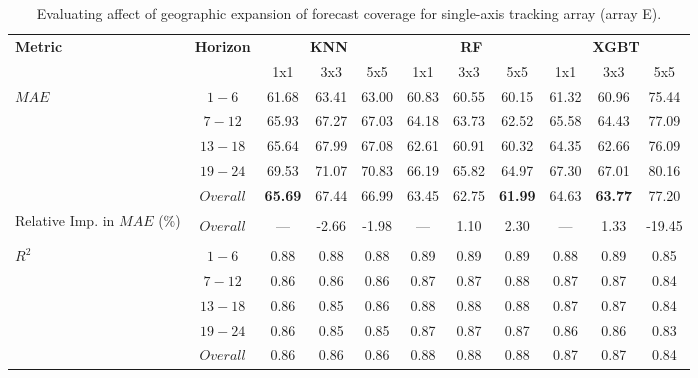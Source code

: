 \begin{table}[h]
\begin{center}
    \caption{Evaluating affect of geographic expansion of forecast coverage for single-axis tracking array (array E).}
    \begin{tabular}{l c c c c c c c c c c}
        \toprule
        \multirow{2}{*}{\textbf{Metric}} & \multirow{2}{*}{\textbf{Horizon}} & \multicolumn{3}{c}{\textbf{KNN}} & \multicolumn{3}{c}{\textbf{RF}} & \multicolumn{3}{c}{\textbf{XGBT}}\\
        \cmidrule{3-11}
         &  & 1x1 & 3x3 & 5x5 & 1x1 & 3x3 & 5x5 & 1x1 & 3x3 & 5x5 \\
        \midrule
        \multirow{5}{*}{$MAE$} & $1 - 6$ & 61.68 & 63.41 & 63.00 & 60.83 & 60.55 & 60.15 & 61.32 & 60.96 & 75.44 \\
        & $7 - 12$ & 65.93 & 67.27 & 67.03 & 64.18 & 63.73 & 62.52  & 65.58 & 64.43 & 77.09 \\
        & $13 - 18$ & 65.64 & 67.99 & 67.08 & 62.61 & 60.91 & 60.32 & 64.35 & 62.66 & 76.09 \\
        & $19 - 24$ & 69.53 & 71.07 & 70.83 & 66.19 & 65.82 & 64.97 & 67.30 & 67.01 & 80.16 \\
        & $Overall$ & \textbf{65.69} & 67.44 & 66.99 & 63.45 & 62.75 & \textbf{61.99} & 64.63 & \textbf{63.77} & 77.20 \\
        \midrule
        \multirow{3}{5em}{Relative Imp. in $MAE$ (\%)} & & & & & & & & & & \\ 
        & $Overall$ & --- & -2.66 & -1.98 & --- & 1.10 & 2.30 & --- & 1.33 & -19.45 \\
        & & & & & & & & & & \\
        \midrule
        \multirow{5}{*}{$R^2$} & $1 - 6$ & 0.88 & 0.88 & 0.88 & 0.89 & 0.89 & 0.89 & 0.88 & 0.89 & 0.85 \\
        & $7 - 12$ & 0.86 & 0.86 & 0.86 & 0.87 & 0.87 & 0.88 & 0.87 & 0.87 & 0.84 \\
        & $13 - 18$ & 0.86 & 0.85 & 0.86 & 0.88 & 0.88 & 0.88 & 0.87 & 0.87 & 0.84 \\
        & $19 - 24$ & 0.86 & 0.85 & 0.85 & 0.87 & 0.87 & 0.87 & 0.86 & 0.86 & 0.83 \\
        & $Overall$ & 0.86 & 0.86 & 0.86 & 0.88 & 0.88 & 0.88 & 0.87 & 0.87 & 0.84 \\
        \bottomrule
    \end{tabular}
\end{center}
\end{table}

